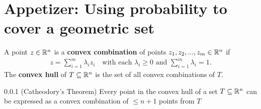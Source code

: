 

\section{Appetizer: Using probability to cover a geometric set}

A point $z \in \mathbb{R}^n$ is a \textbf{convex combination} of points $z_1,z_2, ..., z_m \in \mathbb{R}^n$ if 
\begin{align*}
z = \sum_{i=1}^m \lambda_i z_i \quad\text{with each } \lambda_i\geq0 \text{ and } \sum_{i=1}^m \lambda_i = 1.
\end{align*}
The \textbf{convex hull} of $T \subseteq \mathbb{R}^n$ is the set of all convex combinations of $T$.

\begin{thm}{0.0.1} (Catheodory's Theorem)
Every point in the convex hull of a set $T \subseteq  \mathbb{R}^n$ can be expressed as a convex combination of $\leq n+1$ points from $T$
\end{thm}